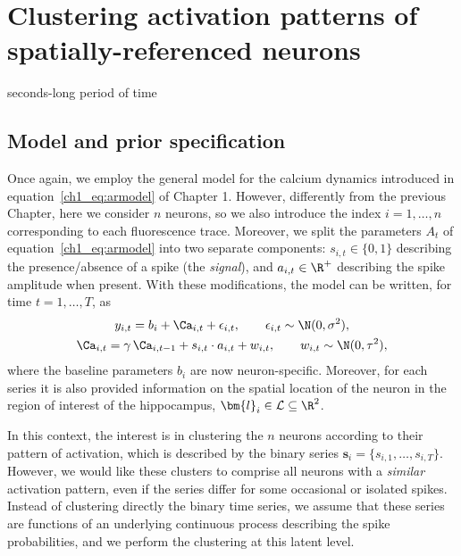 \chapter{Clustering activation patterns of spatially-referenced neurons}


seconds-long period of time \cite{cone2021}

\section{Model and prior specification}
Once again, we employ the general model for the calcium dynamics introduced in equation~\eqref{ch1_eq:armodel} of Chapter 1. However, differently from the previous Chapter, here we consider $n$ neurons, so we also introduce the index $i=1,\dots,n$ corresponding to each fluorescence trace. 
Moreover, we split the parameters $A_t$ of equation~\eqref{ch1_eq:armodel} into two separate components: $s_{i,t}\in\{0,1\}$ describing the presence/absence of a spike (the \textit{signal}), and $a_{i,t}\in\R^+$ describing the spike amplitude when present.
With these modifications, the model can be written, for time $t=1,\dots,T$, as
\begin{equation}
\begin{gathered}
y_{i,t} = b_i + \Ca_{i,t} + \epsilon_{i,t},\qquad \epsilon_{i,t} \sim \N(0,\sigma^2),  \\
\Ca_{i,t} = \gamma\, \Ca_{i,t-1} + s_{i,t}\cdot a_{i,t} + w_{i,t}, \qquad w_{i,t} \sim \N(0, \tau^2),
\end{gathered}
\label{ch4_eq:armodel_mult}
\end{equation}
where the baseline parameters $b_i$ are now neuron-specific.
Moreover, for each series it is also provided information on the spatial location of the neuron in the region of interest of the hippocampus, $\bm{l}_i \in \mathcal{L}\subseteq\R^2$.

In this context, the interest is in clustering the $n$ neurons according to their pattern of activation, which is described by the binary series $\bm{s}_i = \{s_{i,1},\dots,s_{i,T}\}$. However, we would like these clusters to comprise all neurons with a \textit{similar} activation pattern, even if the series differ for some occasional or isolated spikes. Instead of clustering directly the binary time series, we assume that these series are functions of an underlying continuous process describing the spike probabilities, and we perform the clustering at this latent level.

